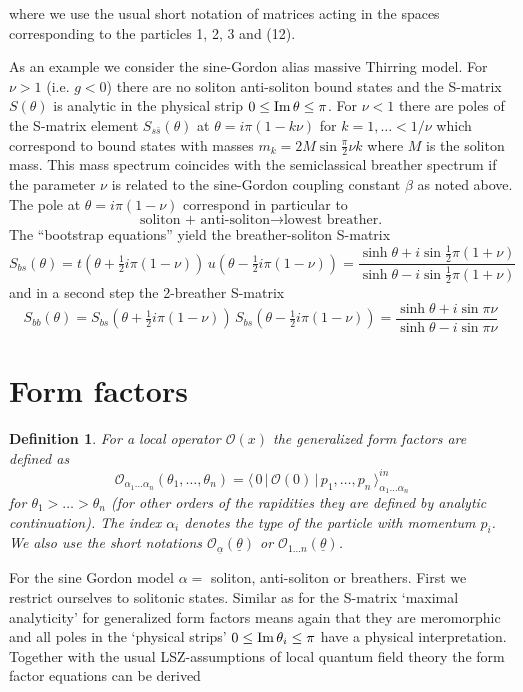 \documentclass[a4paper,12pt]{article}
\newtheorem{definition}{Definition}{}
\def\func#1{\mathop{\rm #1}}%
\begin{document}
where we use the usual short notation of matrices acting in the spaces
corresponding to the particles 1, 2, 3 and (12).

As an example we consider the sine-Gordon alias massive Thirring model. For $%
\nu >1$ (i.e. $g<0$) there are no soliton anti-soliton bound states and the
S-matrix $S(\theta )$ is analytic in the physical strip $0\leq \func{Im}%
\theta \leq \pi $. For $\nu <1$ there are poles of the S-matrix element $S_{s%
\bar{s}}(\theta )$ at $\theta =i\pi (1-k\nu )$ for $k=1,\dots <1/\nu $ which
correspond to bound states with masses $m_{k}=2M\sin \tfrac{\pi }{2}\nu k$
where $M$ is the soliton mass. This mass spectrum coincides with the
semiclassical \cite{DHNKF} breather spectrum if the parameter $\nu $ is
related to the sine-Gordon coupling constant $\beta $ as noted above. The
pole at $\theta =i\pi (1-\nu )$ correspond in particular to 
\[
\text{soliton + anti-soliton}\longrightarrow \text{lowest breather.} 
\]
The ``bootstrap equations'' yield the breather-soliton S-matrix \cite{KT} 
\[
S_{bs}(\theta )=t(\theta +\tfrac{1}{2}i\pi (1-\nu ))\,u(\theta -\tfrac{1}{2}%
i\pi (1-\nu ))=\frac{\sinh \theta +i\sin \tfrac{1}{2}\pi (1+\nu )}{\sinh
\theta -i\sin \tfrac{1}{2}\pi (1+\nu )} 
\]
and in a second step the 2-breather S-matrix \cite{KT} 
\[
S_{bb}(\theta )=S_{bs}(\theta +\tfrac{1}{2}i\pi (1-\nu ))\,S_{bs}(\theta -%
\tfrac{1}{2}i\pi (1-\nu ))=\frac{\sinh \theta +i\sin \pi \nu }{\sinh \theta
-i\sin \pi \nu } 
\]

\section{Form factors}

\begin{definition}
For a local operator $\mathcal{O}(x)$ the generalized form factors \cite{KW}
are defined as 
\[
\,\mathcal{O}_{\alpha _{1}\dots \alpha _{n}}\left( \theta _{1},\dots ,\theta
_{n}\right) =\langle \,0\,|\,\mathcal{O}(0)\,|\,p_{1},\dots ,p_{n}\,\rangle
_{\alpha _{1}\dots \alpha _{n}}^{in} 
\]
for $\theta _{1}>\dots >\theta _{n}$ (for other orders of the rapidities
they are defined by analytic continuation). The index $\alpha _{i}$%
\thinspace denotes the type of the particle with momentum $p_{i}$. We also
use the short notations $\mathcal{O}_{\underline{\alpha }}(\underline{\theta 
})$ or $\mathcal{O}_{1\dots n}(\underline{\theta })$.
\end{definition}

For the sine Gordon model $\alpha =$ soliton, anti-soliton or breathers.
First we restrict ourselves to solitonic states. Similar as for the S-matrix
`maximal analyticity' for generalized form factors means again that they are
meromorphic and all poles in the `physical strips' $0\leq \func{Im}\theta
_{i}\leq \pi $ have a physical interpretation. Together with the usual
LSZ-assumptions \cite{LSZ} of local quantum field theory the form factor
equations can be derived
\end{document}
